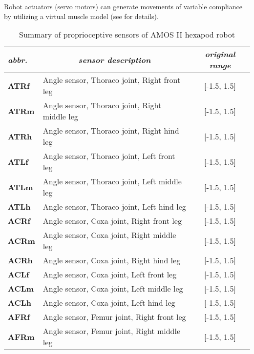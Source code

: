 Robot actuators (servo motors) can generate movements of variable compliance by utilizing a virtual muscle model (see \cite{misc:amosii} for details). 

\begin{table}[H]
\centering
\caption{Summary of proprioceptive sensors of AMOS II hexapod robot}
\label{tab:proprioceptors}
\begin{tabular}{|l|l|c|}
\hline
\textit{abbr.} & \multicolumn{1}{c|}{\textit{sensor description}} & \textit{original range} \\ \hline
\textbf{ATRf}         & Angle sensor, Thoraco joint, Right front leg     & {[}-1.5, 1.5{]}         \\ \hline
\textbf{ATRm}         & Angle sensor, Thoraco joint, Right middle leg    & {[}-1.5, 1.5{]}         \\ \hline
\textbf{ATRh}         & Angle sensor, Thoraco joint, Right hind leg      & {[}-1.5, 1.5{]}         \\ \hline
\textbf{ATLf}         & Angle sensor, Thoraco joint, Left front leg      & {[}-1.5, 1.5{]}         \\ \hline
\textbf{ATLm}         & Angle sensor, Thoraco joint, Left middle leg     & {[}-1.5, 1.5{]}         \\ \hline
\textbf{ATLh}         & Angle sensor, Thoraco joint, Left hind leg       & {[}-1.5, 1.5{]}         \\ \hline
\textbf{ACRf}         & Angle sensor, Coxa joint, Right front leg        & {[}-1.5, 1.5{]}         \\ \hline
\textbf{ACRm}         & Angle sensor, Coxa joint, Right middle leg       & {[}-1.5, 1.5{]}         \\ \hline
\textbf{ACRh}         & Angle sensor, Coxa joint, Right hind leg         & {[}-1.5, 1.5{]}         \\ \hline
\textbf{ACLf}         & Angle sensor, Coxa joint, Left front leg         & {[}-1.5, 1.5{]}         \\ \hline
\textbf{ACLm}         & Angle sensor, Coxa joint, Left middle leg        & {[}-1.5, 1.5{]}         \\ \hline
\textbf{ACLh}         & Angle sensor, Coxa joint, Left hind leg          & {[}-1.5, 1.5{]}         \\ \hline
\textbf{AFRf}         & Angle sensor, Femur joint, Right front leg       & {[}-1.5, 1.5{]}         \\ \hline
\textbf{AFRm}         & Angle sensor, Femur joint, Right middle leg      & {[}-1.5, 1.5{]}         \\ \hline

\end{tabular}
\end{table}

